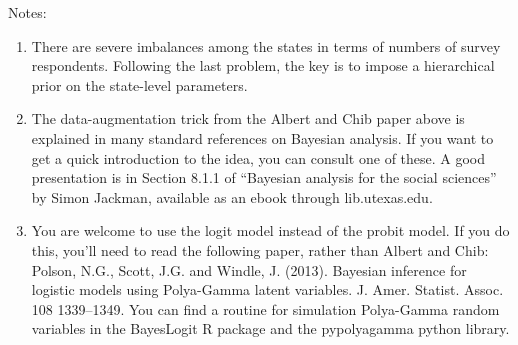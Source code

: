 \documentclass{mynotes}
\begin{document}
Notes:
\begin{enumerate}
\item There are severe imbalances among the states in terms of numbers of survey respondents. Following the last problem, the key is to impose a hierarchical prior on the state-level parameters.
\item The data-augmentation trick from the Albert and Chib paper above is explained in many standard references on Bayesian analysis.  If you want to get a quick introduction to the idea, you can consult one of these.  A good presentation is in Section 8.1.1 of ``Bayesian analysis for the social sciences'' by Simon Jackman, available as an ebook through lib.utexas.edu.
\item You are welcome to use the logit model instead of the probit model.  If you do this, you'll need to read the following paper, rather than Albert and Chib: Polson, N.G., Scott, J.G. and Windle, J. (2013). Bayesian inference for logistic models using Polya-Gamma latent variables. J. Amer. Statist. Assoc. 108 1339--1349.    You can find a routine for simulation Polya-Gamma random variables in the BayesLogit R package and the pypolyagamma python library.  
\end{enumerate}
\end{document}

